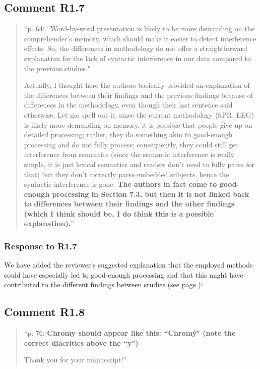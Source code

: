 \documentclass[12pt]{article}
\begin{document}
\subsection*{Comment R1.7}
\begin{quote}
``p. 64: ``Word-by-word presentation is likely to be more demanding on the comprehender's memory, which should make it easier to detect interference effects. So, the differences in methodology do not offer a straightforward
explanation for the lack of syntactic interference in our data compared to the
previous studies."

Actually, I thought here the authors basically provided an explanation of the differences between their findings and the previous findings because of differences in the methodology, even though their last sentence said otherwise. Let me spell out it: since the current methodology (SPR, EEG) is likely more demanding on memory, it is possible that people give up on detailed processing; rather, they do something akin to good-enough processing and do not fully process; consequently, they could still get interference from semantics (since the semantic interference is really simple, it is just lexical semantics and readers don't need to fully parse for that) but they don't correctly parse embedded subjects, hence the syntactic interference is gone. \textbf{The authors in fact come to good-enough processing in Section 7.3, but then it is not linked back to differences between their findings and the other findings (which I think should be, I do think this is a possible explanation).}''
\end{quote}

\subsubsection*{Response to R1.7}
We have added the reviewer's suggested explanation that the employed methods could have especially led to good-enough processing and that this might have contributed to the different findings between studies (see page \pageref{SPR_goodenough}):

\begin{quote}
\end{quote}

\subsection*{Comment R1.8}
\begin{quote}
``p. 76: \textbf{Chromy should appear like this: ``Chromý" (note the correct diacritics above the ``y")}

Thank you for your manuscript!''
\end{quote}
\end{document}
